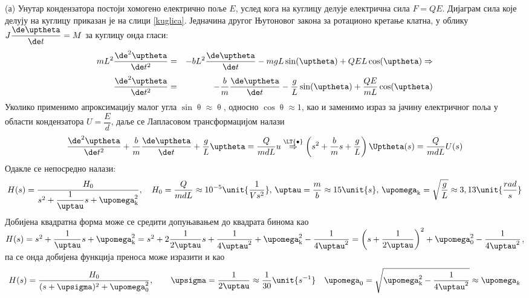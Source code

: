 \RESENJE
(а) Унутар кондензатора постоји хомогено електрично поље $E$, услед кога на куглицу 
делује електрична сила $F = QE$.
Дијаграм сила које делују на куглицу приказан је на слици \ref{kuglica}.
Једначина другог Њутоновог закона за ротационо кретање клатна, у облику $J \dfrac{\de\uptheta}{\de t} = M$ за
куглицу онда гласи:
\begin{eqnarray} 
    mL^2 \dfrac{\de^2 \uptheta}{\de t^2} &=& - b L^2 \dfrac{\de \uptheta}{\de t} - mgL\sin(\uptheta) + QE L\cos(\uptheta) \Rightarrow \\[1mm]
    \dfrac{\de^2 \uptheta}{\de t^2} &=& - \dfrac{b}{m}  \dfrac{\de \uptheta}{\de t} - \dfrac{g}{L} \sin(\uptheta) + \dfrac{QE}{mL}\cos(\uptheta)
\end{eqnarray}
Уколико применимо апроксимацију малог угла $\sin\uptheta \approx \uptheta$, односно $\cos \uptheta \approx 1$, као и заменимо 
израз за јачину електричног поља у области кондензатора $U = \dfrac{E}{d}$, даље се Лапласовом трансформацијом налази 
\begin{eqnarray}
    \dfrac{\de^2 \uptheta}{\de t^2} + \dfrac{b}{m}  \dfrac{\de \uptheta}{\de t} + \dfrac{g}{L} \uptheta =  \dfrac{Q}{mdL} u
    \overset{{\LT{\bullet}}}{ \Rightarrow } 
    \left(
        s^2 + \dfrac{b}{m} s +  \dfrac{g}{L}
    \right) \Uptheta(s) 
    =
    \dfrac{Q}{mdL} U(s)
\end{eqnarray}
Одакле се непосредно налази:
\begin{equation}
    H(s) = \dfrac{ H_0 }{s^2 + \dfrac{1}{\uptau} s + \upomega_{\rm k}^2}, \quad H_0 = \dfrac{Q}{mdL} \approx 10^{-5} \unit{\dfrac{1}{Vs^2}} ,\, \uptau = \dfrac{m}{b} 
    \approx 15\unit{s},\, \upomega_{\rm k} = \sqrt{\dfrac{g}{L}} \approx 3,13\unit{\dfrac{rad}{s}}
\end{equation}
Добијена квадратна форма може се средити допуњавањем до квадрата бинома као 
$ H(s) = s^2 + \dfrac{1}{\uptau} s + \upomega_{\rm k}^2 = s^2 + 2 \dfrac{1}{2\uptau} s + \dfrac{1}{4\uptau^2} + \upomega_{\rm k}^2 - \dfrac{1}{4\uptau^2} 
= \left( s + \dfrac{1}{2\uptau} \right)^2 +  \upomega_0^2 - \dfrac{1}{4\uptau^2}$, па се онда добијена функција преноса може изразити и као 
\begin{eqnarray}
    H(s) = \dfrac{H_0}{(s + \upsigma)^2 + \upomega_0^2}, \qquad \upsigma = \dfrac{1}{2\uptau} \approx \dfrac{1}{30} \unit{s^{-1}} \quad \upomega_0 = \sqrt{\upomega_{\rm k}^2 - \dfrac{1}{4\uptau^2} }
    \approx \upomega_k
\end{eqnarray}

